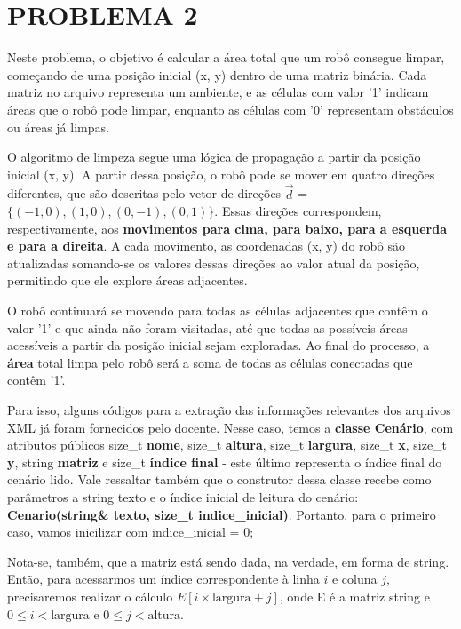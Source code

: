 
\section{PROBLEMA 2}

Neste problema, o objetivo é calcular a área total que um robô consegue limpar, começando de uma posição inicial (x, y) dentro de uma matriz binária. Cada matriz no arquivo representa um ambiente, e as células com valor '1' indicam áreas que o robô pode limpar, enquanto as células com '0' representam obstáculos ou áreas já limpas.


O algoritmo de limpeza segue uma lógica de propagação a partir da posição inicial (x, y). A partir dessa posição, o robô pode se mover em quatro direções diferentes, que são descritas pelo vetor de direções $\vec{d}$  = $\{(-1, 0), (1, 0), (0, -1), (0, 1)\}$. Essas direções correspondem, respectivamente, aos \textbf{movimentos para cima, para baixo, para a esquerda e para a direita}. A cada movimento, as coordenadas (x, y) do robô são atualizadas somando-se os valores dessas direções ao valor atual da posição, permitindo que ele explore áreas adjacentes.


O robô continuará se movendo para todas as células adjacentes que contêm o valor '1' e que ainda não foram visitadas, até que todas as possíveis áreas acessíveis a partir da posição inicial sejam exploradas. Ao final do processo, a \textbf{área} total limpa pelo robô será a soma de todas as células conectadas que contêm '1'.

Para isso, alguns códigos para a extração das informações relevantes dos arquivos XML já foram fornecidos pelo docente. Nesse caso, temos a \textbf{classe Cenário}, com atributos públicos size\_t \textbf{nome}, size\_t \textbf{altura}, size\_t \textbf{largura}, size\_t \textbf{x}, size\_t \textbf{y}, string \textbf{matriz} e size\_t \textbf{índice final} - este último representa o índice final do cenário lido. Vale ressaltar também que o construtor dessa classe recebe como parâmetros a string texto e o índice inicial de leitura do cenário: \textbf{Cenario(string& texto, size\_t indice\_inicial)}. Portanto, para o primeiro caso, vamos inicilizar com indice\_inicial = 0;

Nota-se, também, que a matriz está sendo dada, na verdade, em forma de string. Então, para acessarmos um índice correspondente à linha $i$ e coluna $j$, precisaremos realizar o cálculo $E[i \times \text{largura} + j]$, onde E é a matriz string e $0 \leq i < \text{largura}$ e $0 \leq j < \text{altura}$.

